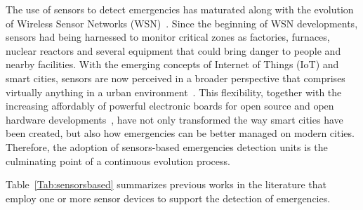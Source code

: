 \begin{refsection}
The use of sensors to detect emergencies has maturated along with the evolution of Wireless Sensor Networks (WSN)~\cite{surveywsn2}. Since the beginning of WSN developments, sensors had being harnessed to monitor critical zones as factories, furnaces, nuclear reactors and several equipment that could bring danger to people and nearby facilities. With the emerging concepts of Internet of Things (IoT) and smart cities, sensors are now perceived in a broader perspective that comprises virtually anything in a urban environment~\cite{smartsensing1,smartsensing3}. This flexibility, together with the increasing affordably of powerful electronic boards for open source and open hardware developments~\cite{PlatformsSC}, have not only transformed the way smart cities have been created, but also how emergencies can be better managed on modern cities. Therefore, the adoption of sensors-based emergencies detection units is the culminating point of a continuous evolution process. 

Table~\ref{Tab:sensorsbased} summarizes previous works in the literature that employ one or more sensor devices to support the detection of emergencies.


\end{refsection}
